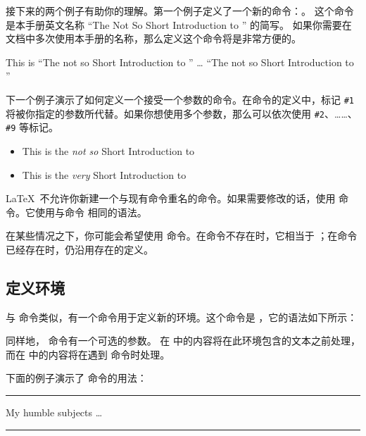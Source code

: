 接下来的两个例子有助你的理解。第一个例子定义了一个新的命令：。
这个命令是本手册英文名称 ``The Not So Short Introduction to \LaTeXe'' 的简写。
如果你需要在文档中多次使用本手册的名称，那么定义这个命令将是非常方便的。

\begin{example}
\newcommand{\tnss}{The not
    so Short Introduction to
    \LaTeXe}
This is ``\tnss'' \ldots{}
``\tnss''
\end{example}

下一个例子演示了如何定义一个接受一个参数的命令。在命令的定义中，标记 \verb|#1| 
将被你指定的参数所代替。如果你想使用多个参数，那么可以依次使用 \verb|#2|、……、
\verb|#9| 等标记。

\begin{example}
\newcommand{\txsit}[1]
 {This is the \emph{#1} Short
      Introduction to \LaTeXe}
\begin{itemize}
\item \txsit{not so}
\item \txsit{very}
\end{itemize}
\end{example}

\LaTeX\ 不允许你新建一个与现有命令重名的命令。如果需要修改的话，使用  命令。它使用与命令 
相同的语法。

在某些情况之下，你可能会希望使用  命令。在命令不存在时，它相当于  
；在命令已经存在时，仍沿用存在的定义。

\subsection{定义环境}

与  命令类似，有一个命令用于定义新的环境。这个命令是 ，它的语法如下所示：

\begin{command}
\end{command}

同样地， 命令有一个可选的参数。
在  中的内容将在此环境包含的文本之前处理，而在  中的内容将在遇到  命令时处理。

下面的例子演示了  命令的用法：
\begin{example}
\newenvironment{king}
{\rule{1ex}{1ex}%
     \hspace{\stretch{1}}}
{%
     \rule{1ex}{1ex}}

\begin{king}
My humble subjects \ldots
\end{king}
\end{example}


